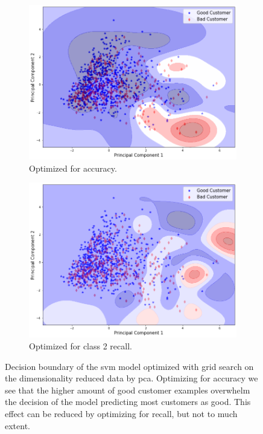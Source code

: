 \documentclass[runningheads]{llncs}
\begin{document}
\begin{figure}
  \centering
  \begin{subfigure}[b]{0.49\textwidth}
    \includegraphics[width=\textwidth]{images/svm_pca_simple_plot.png}
    \caption{Optimized for accuracy.}
    \label{svm_pca_plot}
  \end{subfigure}
  \hfill
  \begin{subfigure}[b]{0.49\textwidth}
    \includegraphics[width=\textwidth]{images/svm_pca_grid_recall_plot.png}
    \caption{Optimized for class 2 recall.}
    \label{svm_pca_recall_plot}
  \end{subfigure}
  \caption{Decision boundary of the svm model optimized with grid search on the dimensionality reduced data by pca. Optimizing for accuracy we see that the higher amount of good customer examples overwhelm the decision of the model predicting most customers as good. This effect can be reduced by optimizing for recall, but not to much extent.}
  \label{decision_boundary}
\end{figure}
\end{document}
